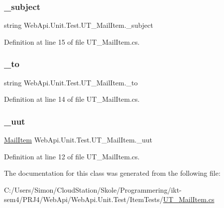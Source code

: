 \subsubsection{\texorpdfstring{\+\_\+subject}{\_subject}}
{\footnotesize\ttfamily string Web\+Api.\+Unit.\+Test.\+U\+T\+\_\+\+Mail\+Item.\+\_\+subject\hspace{0.3cm}{\ttfamily [private]}}



Definition at line 15 of file U\+T\+\_\+\+Mail\+Item.\+cs.

\mbox{\label{class_web_api_1_1_unit_1_1_test_1_1_u_t___mail_item_a02649cd23d602b3bd7f62d85acd7082e}} 
\subsubsection{\texorpdfstring{\+\_\+to}{\_to}}
{\footnotesize\ttfamily string Web\+Api.\+Unit.\+Test.\+U\+T\+\_\+\+Mail\+Item.\+\_\+to\hspace{0.3cm}{\ttfamily [private]}}



Definition at line 14 of file U\+T\+\_\+\+Mail\+Item.\+cs.

\mbox{\label{class_web_api_1_1_unit_1_1_test_1_1_u_t___mail_item_a5cc2b8ae585b1fc9f539aadc7016d88f}} 
\subsubsection{\texorpdfstring{\+\_\+uut}{\_uut}}
{\footnotesize\ttfamily \mbox{\hyperlink{class_f_w_p_s_1_1_models_1_1_mail_item}{Mail\+Item}} Web\+Api.\+Unit.\+Test.\+U\+T\+\_\+\+Mail\+Item.\+\_\+uut\hspace{0.3cm}{\ttfamily [private]}}



Definition at line 12 of file U\+T\+\_\+\+Mail\+Item.\+cs.



The documentation for this class was generated from the following file\+:\begin{DoxyCompactItemize}
\item 
C\+:/\+Users/\+Simon/\+Cloud\+Station/\+Skole/\+Programmering/ikt-\/sem4/\+P\+R\+J4/\+Web\+Api/\+Web\+Api.\+Unit.\+Test/\+Item\+Tests/\mbox{\hyperlink{_u_t___mail_item_8cs}{U\+T\+\_\+\+Mail\+Item.\+cs}}\end{DoxyCompactItemize}
